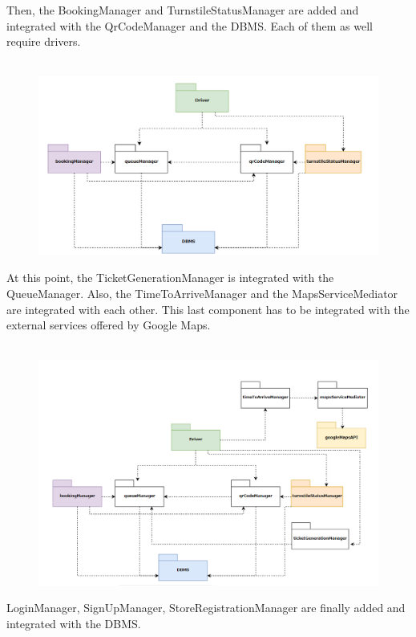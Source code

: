 \documentclass{article}
\begin{document}
Then, the BookingManager and TurnstileStatusManager are added and integrated with the QrCodeManager and the DBMS. Each of them as well require drivers.\\
\smallskip\\
\begin{figure}[H]
  \includegraphics[width=\linewidth]{INTEGR2.png}
  
\end{figure}
At this point, the TicketGenerationManager is integrated with the QueueManager. Also, the TimeToArriveManager and the MapsServiceMediator are integrated with each other. This last component has to be integrated with the external services offered by Google Maps.\\
\smallskip\\
\begin{figure}[H]
  \includegraphics[width=\linewidth]{INTEGR3.png}
  
\end{figure}
LoginManager, SignUpManager, StoreRegistrationManager are finally added and integrated with the DBMS.\\
\end{document}
